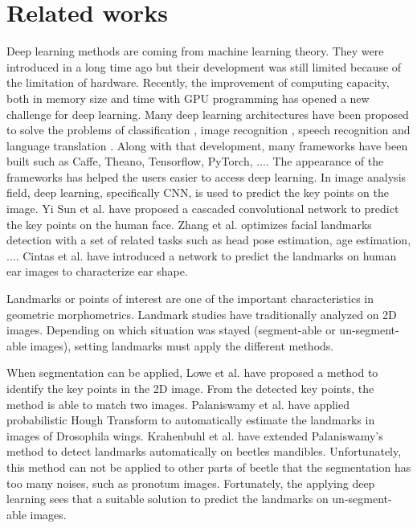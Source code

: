 \documentclass[10pt]{article}
\begin{document}
\section{Related works}
Deep learning methods are coming from machine learning theory. They were introduced in a long time ago but their development was still limited because of the limitation of hardware. Recently, the improvement of computing capacity, both in memory size and time with GPU programming has opened a new challenge for deep learning. Many deep learning architectures have been proposed to solve the problems of classification \cite{krizhevsky2012imagenet, ciregan2012multi}, image recognition \cite{szegedy2015going, farabet2013learning, li2015convolutional}, speech recognition \cite{mikolov2011strategies, hinton2012deep} and language translation \cite{jean2014using, sutskever2014sequence}. Along with that development, many frameworks have been built such as Caffe, Theano, Tensorflow, PyTorch, .... The appearance of the frameworks has helped the users easier to access deep learning. In image analysis field, deep learning, specifically CNN, is used to predict the key points on the image. Yi Sun et al. \cite{sun2013deep} have proposed a cascaded convolutional network to predict the key points on the human face. Zhang et al. \cite{zhang2014facial} optimizes facial landmarks detection with a set of related tasks such as head pose estimation, age estimation, .... Cintas et al. \cite{cintas2016automatic} have introduced a network to predict the landmarks on human ear images to characterize ear shape. 



Landmarks or points of interest are one of the important characteristics in geometric morphometrics. Landmark studies have traditionally analyzed on 2D images. Depending on which situation was stayed (segment-able or un-segment-able images), setting landmarks must apply the different methods.

When segmentation can be applied, Lowe et al. \cite{lowe2004distinctive} have proposed a method to identify the key points in the 2D image. From the detected key points, the method is able to match two images. Palaniswamy et al. \cite{palaniswamy2010automatic} have applied probabilistic Hough Transform to automatically estimate the landmarks in images of Drosophila wings. Krahenbuhl et al. \cite{le2017maelab} have extended Palaniswamy's method to detect landmarks automatically on beetles mandibles. Unfortunately, this method can not be applied to other parts of beetle that the segmentation has too many noises, such as pronotum images. Fortunately, the applying deep learning sees that a suitable solution to predict the landmarks on un-segment-able images.
\end{document}
